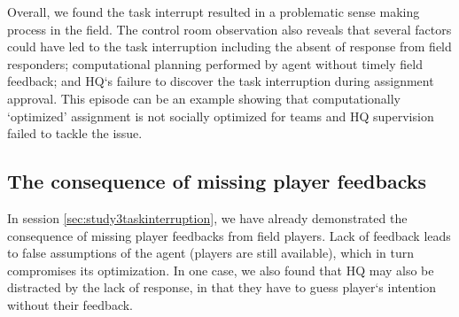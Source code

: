 Overall, we found the task interrupt resulted in a problematic sense making process in the field. The control room observation also reveals that several factors could have led to the task interruption including the absent of response from field responders; computational planning performed by agent without timely field feedback; and HQ`s failure to discover the task interruption during assignment approval. This episode can be an example showing that computationally `optimized' assignment is not socially optimized for teams and HQ supervision failed to tackle the issue.\\

\subsection{The consequence of missing player feedbacks}
In session \ref{sec:study3taskinterruption}, we have already demonstrated the consequence of missing player feedbacks from field players. Lack of feedback leads to false assumptions of the agent (players are still available), which in turn compromises its optimization. In one case, we also found that HQ may also be distracted by the lack of response, in that they have to guess player`s intention without their feedback. \\

\noindent{} 

